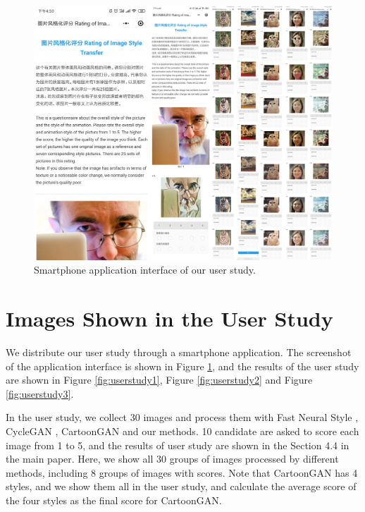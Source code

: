\documentclass[10pt,twocolumn,letterpaper]{article}
\begin{document}
\begin{figure}[t]
\centering
\includegraphics[width=\linewidth]{figures/userstudy_interface.pdf}
\caption{Smartphone application interface of our user study.}
\label{fig:userstudy_interface}
\end{figure}

\section{Images Shown in the User Study}
We distribute our user study through a smartphone application. The screenshot of the application interface is shown in Figure \ref{fig:userstudy_interface}, and the results of the user study are shown in Figure \ref{fig:userstudy1},  Figure \ref{fig:userstudy2} and  Figure \ref{fig:userstudy3}.

In the user study, we collect 30 images and process them with Fast Neural Style \cite{johnson2016perceptual}, CycleGAN \cite{CycleGAN2017}, CartoonGAN \cite{chen2018cartoongan} and our methods. 10 candidate are asked to score each image from 1 to 5, and the results of user study are shown in the Section 4.4 in the main paper. Here, we show all 30 groups of images processed by different methods, including 8 groups of images with scores. Note that CartoonGAN has 4 styles, and we show them all in the user study, and calculate the average score of the four styles as the final score for CartoonGAN.
\end{document}
